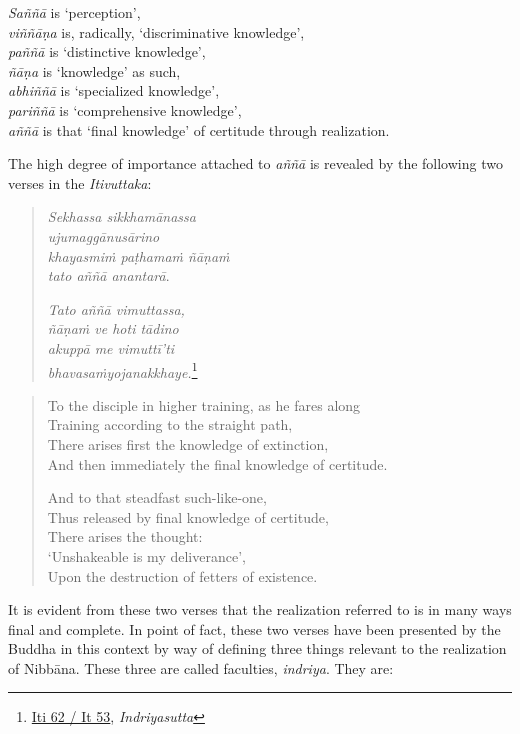 \emph{Saññā} is `perception',\\
\emph{viññāṇa} is, radically, `discriminative knowledge',\\
\emph{paññā} is `distinctive knowledge',\\
\emph{ñāṇa} is `knowledge' as such,\\
\emph{abhiññā} is `specialized knowledge',\\
\emph{pariññā} is `comprehensive knowledge',\\
\emph{aññā} is that `final knowledge' of certitude through realization.

The high degree of importance attached to \emph{aññā} is revealed by the following two verses in the \emph{Itivuttaka}:

\begin{quote}
\emph{Sekhassa sikkhamānassa}\\
\emph{ujumaggānusārino}\\
\emph{khayasmiṁ paṭhamaṁ ñāṇaṁ}\\
\emph{tato aññā anantarā}.

\emph{Tato aññā vimuttassa,}\\
\emph{ñāṇaṁ ve hoti tādino}\\
\emph{akuppā me vimuttī'ti}\\
\emph{bhavasaṁyojanakkhaye.}\footnote{\href{https://suttacentral.net/iti62/pli/ms}{Iti 62 / It 53}, \emph{Indriyasutta}}
\end{quote}

\begin{quote}
To the disciple in higher training, as he fares along\\
Training according to the straight path,\\
There arises first the knowledge of extinction,\\
And then immediately the final knowledge of certitude.

And to that steadfast such-like-one,\\
Thus released by final knowledge of certitude,\\
There arises the thought:\\
\vin `Unshakeable is my deliverance',\\
Upon the destruction of fetters of existence.
\end{quote}

It is evident from these two verses that the realization referred to is in many ways final and complete. In point of fact, these two verses have been presented by the Buddha in this context by way of defining three things relevant to the realization of Nibbāna. These three are called faculties, \emph{indriya}. They are:

